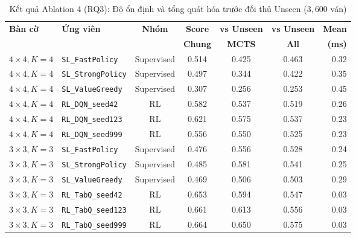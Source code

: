 \documentclass[a4paper,12pt]{report}
\begin{document}
\begin{table}[H]
\centering
\footnotesize
\setlength{\tabcolsep}{4pt}
\caption{Kết quả Ablation 4 (RQ3): Độ ổn định và tổng quát hóa trước đối thủ Unseen ($3{,}600$ ván)}
\label{tab:abl4_rq3}
\vspace{0.2cm}
\begin{tabular}{llccccr}
\toprule
\textbf{Bàn cờ} & \textbf{Ứng viên} & \textbf{Nhóm} & \textbf{Score} & \textbf{vs Unseen} & \textbf{vs Unseen} & \textbf{Mean} \\
 & & & \textbf{Chung} & \textbf{MCTS} & \textbf{All} & \textbf{(ms)} \\
\midrule
$4\times 4, K=4$ & \texttt{SL\_\allowbreak FastPolicy} & Supervised & 0.514 & 0.425 & 0.463 & 0.32 \\
$4\times 4, K=4$ & \texttt{SL\_\allowbreak StrongPolicy} & Supervised & 0.497 & 0.344 & 0.422 & 0.35 \\
$4\times 4, K=4$ & \texttt{SL\_\allowbreak ValueGreedy} & Supervised & 0.307 & 0.256 & 0.253 & 0.45 \\
\cmidrule(lr){2-7}
$4\times 4, K=4$ & \texttt{RL\_\allowbreak DQN\_\allowbreak seed42} & RL & 0.582 & 0.537 & 0.519 & 0.26 \\
$4\times 4, K=4$ & \texttt{RL\_\allowbreak DQN\_\allowbreak seed123} & RL & 0.621 & 0.575 & 0.537 & 0.23 \\
$4\times 4, K=4$ & \texttt{RL\_\allowbreak DQN\_\allowbreak seed999} & RL & 0.556 & 0.550 & 0.525 & 0.23 \\
\midrule
$3\times 3, K=3$ & \texttt{SL\_\allowbreak FastPolicy} & Supervised & 0.476 & 0.556 & 0.528 & 0.24 \\
$3\times 3, K=3$ & \texttt{SL\_\allowbreak StrongPolicy} & Supervised & 0.485 & 0.581 & 0.541 & 0.25 \\
$3\times 3, K=3$ & \texttt{SL\_\allowbreak ValueGreedy} & Supervised & 0.469 & 0.506 & 0.503 & 0.29 \\
\cmidrule(lr){2-7}
$3\times 3, K=3$ & \texttt{RL\_\allowbreak TabQ\_\allowbreak seed42} & RL & 0.653 & 0.594 & 0.547 & 0.03 \\
$3\times 3, K=3$ & \texttt{RL\_\allowbreak TabQ\_\allowbreak seed123} & RL & 0.661 & 0.613 & 0.556 & 0.03 \\
$3\times 3, K=3$ & \texttt{RL\_\allowbreak TabQ\_\allowbreak seed999} & RL & 0.664 & 0.650 & 0.575 & 0.03 \\
\bottomrule
\end{tabular}
\end{table}
\end{document}
